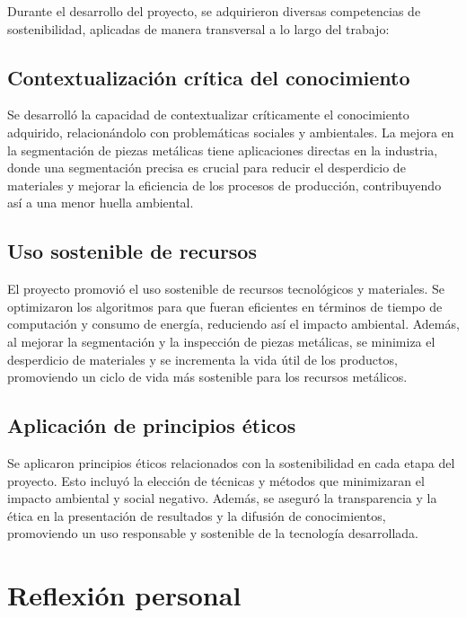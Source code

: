 Durante el desarrollo del proyecto, se adquirieron diversas competencias de sostenibilidad, aplicadas de manera transversal a lo largo del trabajo:

\subsection{Contextualización crítica del conocimiento}\label{contextualización-crítica-del-conocimient-ods}

Se desarrolló la capacidad de contextualizar críticamente el conocimiento adquirido, relacionándolo con problemáticas sociales y ambientales. La mejora en la segmentación de piezas metálicas tiene aplicaciones directas en la industria, donde una segmentación precisa es crucial para reducir el desperdicio de materiales y mejorar la eficiencia de los procesos de producción, contribuyendo así a una menor huella ambiental.

\subsection{Uso sostenible de recursos}\label{uso-sostenible-de-recursos-ods}

El proyecto promovió el uso sostenible de recursos tecnológicos y materiales. Se optimizaron los algoritmos para que fueran eficientes en términos de tiempo de computación y consumo de energía, reduciendo así el impacto ambiental. Además, al mejorar la segmentación y la inspección de piezas metálicas, se minimiza el desperdicio de materiales y se incrementa la vida útil de los productos, promoviendo un ciclo de vida más sostenible para los recursos metálicos.

\subsection{Aplicación de principios éticos}\label{aplicación-de-principios-éticos-ods}

Se aplicaron principios éticos relacionados con la sostenibilidad en cada etapa del proyecto. Esto incluyó la elección de técnicas y métodos que minimizaran el impacto ambiental y social negativo. Además, se aseguró la transparencia y la ética en la presentación de resultados y la difusión de conocimientos, promoviendo un uso responsable y sostenible de la tecnología desarrollada.

\section{Reflexión personal}\label{reflexión-personal-ods}

